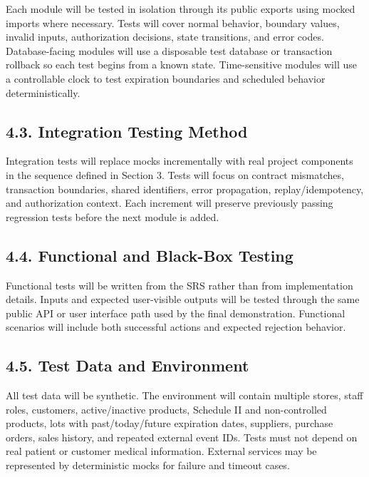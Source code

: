 Each module will be tested in isolation through its public exports using mocked imports where necessary. Tests will cover normal behavior, boundary values, invalid inputs, authorization decisions, state transitions, and error codes. Database-facing modules will use a disposable test database or transaction rollback so each test begins from a known state. Time-sensitive modules will use a controllable clock to test expiration boundaries and scheduled behavior deterministically.

\subsection{4.3. Integration Testing Method}\label{integration-testing-method}

Integration tests will replace mocks incrementally with real project components in the sequence defined in Section 3. Tests will focus on contract mismatches, transaction boundaries, shared identifiers, error propagation, replay/idempotency, and authorization context. Each increment will preserve previously passing regression tests before the next module is added.

\subsection{4.4. Functional and Black-Box Testing}\label{functional-and-black-box-testing}

Functional tests will be written from the SRS rather than from implementation details. Inputs and expected user-visible outputs will be tested through the same public API or user interface path used by the final demonstration. Functional scenarios will include both successful actions and expected rejection behavior.

\subsection{4.5. Test Data and Environment}\label{test-data-and-environment}

All test data will be synthetic. The environment will contain multiple stores, staff roles, customers, active/inactive products, Schedule II and non-controlled products, lots with past/today/future expiration dates, suppliers, purchase orders, sales history, and repeated external event IDs. Tests must not depend on real patient or customer medical information. External services may be represented by deterministic mocks for failure and timeout cases.

